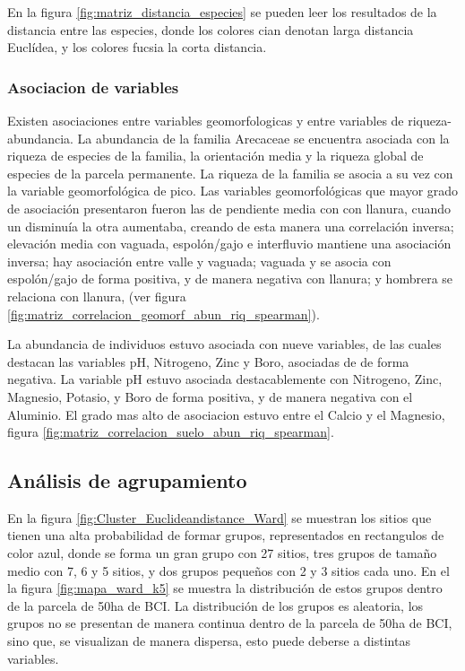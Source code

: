 \documentclass[11pt,]{article}
\begin{document}
En la figura \ref{fig:matriz_distancia_especies} se pueden leer los
resultados de la distancia entre las especies, donde los colores cian
denotan larga distancia Euclídea, y los colores fucsia la corta
distancia.

\subsubsection{Asociacion de variables}\label{asociacion-de-variables}

Existen asociaciones entre variables geomorfologicas y entre variables
de riqueza-abundancia. La abundancia de la familia Arecaceae se
encuentra asociada con la riqueza de especies de la familia, la
orientación media y la riqueza global de especies de la parcela
permanente. La riqueza de la familia se asocia a su vez con la variable
geomorfológica de pico. Las variables geomorfológicas que mayor grado de
asociación presentaron fueron las de pendiente media con con llanura,
cuando un disminuía la otra aumentaba, creando de esta manera una
correlación inversa; elevación media con vaguada, espolón/gajo e
interfluvio mantiene una asociación inversa; hay asociación entre valle
y vaguada; vaguada y se asocia con espolón/gajo de forma positiva, y de
manera negativa con llanura; y hombrera se relaciona con llanura, (ver
figura \ref{fig:matriz_correlacion_geomorf_abun_riq_spearman}).

La abundancia de individuos estuvo asociada con nueve variables, de las
cuales destacan las variables pH, Nitrogeno, Zinc y Boro, asociadas de
de forma negativa. La variable pH estuvo asociada destacablemente con
Nitrogeno, Zinc, Magnesio, Potasio, y Boro de forma positiva, y de
manera negativa con el Aluminio. El grado mas alto de asociacion estuvo
entre el Calcio y el Magnesio, figura
\ref{fig:matriz_correlacion_suelo_abun_riq_spearman}.

\subsection{Análisis de agrupamiento}\label{anuxe1lisis-de-agrupamiento}

En la figura \ref{fig:Cluster_Euclideandistance_Ward} se muestran los
sitios que tienen una alta probabilidad de formar grupos, representados
en rectangulos de color azul, donde se forma un gran grupo con 27
sitios, tres grupos de tamaño medio con 7, 6 y 5 sitios, y dos grupos
pequeños con 2 y 3 sitios cada uno. En el la figura
\ref{fig:mapa_ward_k5} se muestra la distribución de estos grupos dentro
de la parcela de 50ha de BCI. La distribución de los grupos es
aleatoria, los grupos no se presentan de manera continua dentro de la
parcela de 50ha de BCI, sino que, se visualizan de manera dispersa, esto
puede deberse a distintas variables.
\end{document}
